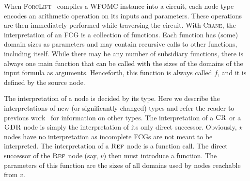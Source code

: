 \documentclass{article}
\theoremstyle{definition}
\DeclareMathOperator{\CR}{\textsc{CR}}
\DeclareMathOperator{\GDR}{\textsc{GDR}}
\DeclareMathOperator{\Reff}{\textsc{Ref}}
\begin{document}
When \textsc{ForcLift}~\cite{DBLP:conf/ijcai/BroeckTMDR11} compiles a WFOMC
instance into a circuit, each node type encodes an arithmetic operation on its
inputs and parameters. These operations are then immediately performed while
traversing the circuit. With \textsc{Crane}, the interpretation of an FCG is a
collection of functions. Each function has (some) domain sizes as parameters and
may contain recursive calls to other functions, including itself. While there
may be any number of subsidiary functions, there is always one main function
that can be called with the sizes of the domains of the input formula as
arguments. Henceforth, this function is always called $f$, and it is defined by
the source node.

The interpretation of a node is decided by its type. Here we describe the
interpretations of new (or significantly changed) types and refer the reader to
previous work~\cite{DBLP:conf/ijcai/BroeckTMDR11} for information on other
types. The interpretation of a $\CR$ or a $\GDR$ node is simply the
interpretation of its only direct successor. Obviously, $\star$ nodes have no
interpretation as incomplete FCGs are not meant to be interpreted. The
interpretation of a $\Reff$ node is a function call. The direct successor of the
$\Reff$ node (say, $v$) then must introduce a function. The parameters of this
function are the sizes of all domains used by nodes reachable from $v$.
\end{document}
